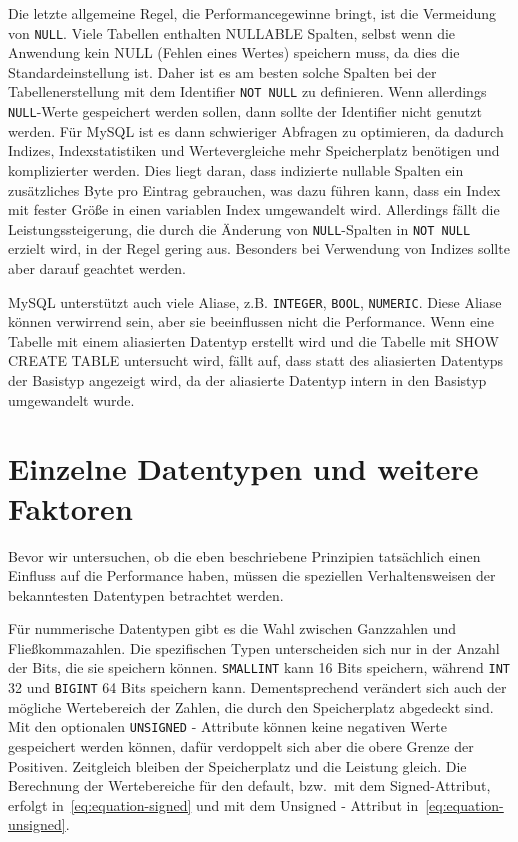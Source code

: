 Die letzte allgemeine Regel, die Performancegewinne bringt, ist die Vermeidung von \texttt{NULL}.
Viele Tabellen enthalten NULLABLE Spalten, selbst wenn die Anwendung kein NULL (Fehlen eines Wertes) speichern muss, da dies die Standardeinstellung ist.
Daher ist es am besten solche Spalten bei der Tabellenerstellung mit dem Identifier \texttt{NOT NULL} zu definieren.
Wenn allerdings \texttt{NULL}-Werte gespeichert werden sollen, dann sollte der Identifier nicht genutzt werden.
Für MySQL ist es dann schwieriger Abfragen zu optimieren, da dadurch Indizes, Indexstatistiken und Wertevergleiche mehr Speicherplatz benötigen und komplizierter werden.
Dies liegt daran, dass indizierte nullable Spalten ein zusätzliches Byte pro Eintrag gebrauchen, was dazu führen kann, dass ein Index mit fester Größe in einen variablen Index umgewandelt wird.
Allerdings fällt die Leistungssteigerung, die durch die Änderung von \texttt{NULL}-Spalten in \texttt{NOT NULL} erzielt wird, in der Regel gering aus.
Besonders bei Verwendung von Indizes sollte aber darauf geachtet werden.

MySQL unterstützt auch viele Aliase, z.B. \texttt{INTEGER}, \texttt{BOOL}, \texttt{NUMERIC}.
Diese Aliase können verwirrend sein, aber sie beeinflussen nicht die Performance.
Wenn eine Tabelle mit einem aliasierten Datentyp erstellt wird und die Tabelle mit SHOW CREATE TABLE untersucht wird, fällt auf, dass statt des aliasierten Datentyps der Basistyp angezeigt wird, da der aliasierte Datentyp intern in den Basistyp umgewandelt wurde.

\section{Einzelne Datentypen und weitere Faktoren}\label{sec:data-types-einzelne-datentypen-und-weitere-faktoren}
Bevor wir untersuchen, ob die eben beschriebene Prinzipien tatsächlich einen Einfluss auf die Performance haben, müssen die speziellen Verhaltensweisen der bekanntesten Datentypen betrachtet werden.

Für nummerische Datentypen gibt es die Wahl zwischen Ganzzahlen und Fließkommazahlen.
Die spezifischen Typen unterscheiden sich nur in der Anzahl der Bits, die sie speichern können.
\texttt{SMALLINT} kann 16 Bits speichern, während \texttt{INT} 32 und \texttt{BIGINT} 64 Bits speichern kann.
Dementsprechend verändert sich auch der mögliche Wertebereich der Zahlen, die durch den Speicherplatz abgedeckt sind.
Mit den optionalen \texttt{UNSIGNED} - Attribute können keine negativen Werte gespeichert werden können, dafür verdoppelt sich aber die obere Grenze der Positiven.
Zeitgleich bleiben der Speicherplatz und die Leistung gleich.
Die Berechnung der Wertebereiche für den default, bzw.\ mit dem Signed-Attribut, erfolgt in~\ref{eq:equation-signed} und mit dem Unsigned - Attribut in~\ref{eq:equation-unsigned}.

